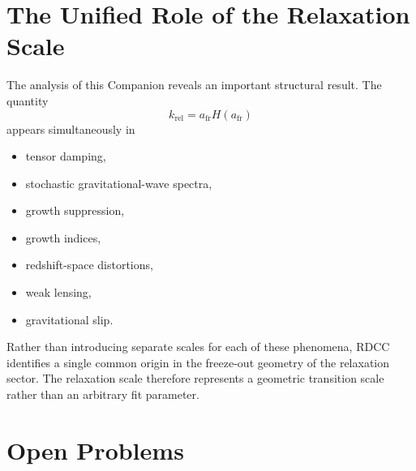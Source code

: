 \documentclass[11pt,a4paper]{article}
\begin{document}
\section{The Unified Role of the Relaxation Scale}

The analysis of this Companion reveals an important structural result. The
quantity
\begin{equation}
  k_{\mathrm{rel}}
  =
  a_{\mathrm{fr}} H(a_{\mathrm{fr}})
\end{equation}
appears simultaneously in
\begin{itemize}
  \item tensor damping,
  \item stochastic gravitational-wave spectra,
  \item growth suppression,
  \item growth indices,
  \item redshift-space distortions,
  \item weak lensing,
  \item gravitational slip.
\end{itemize}
Rather than introducing separate scales for each of these phenomena, RDCC
identifies a single common origin in the freeze-out geometry of the
relaxation sector. The relaxation scale therefore represents a geometric
transition scale rather than an arbitrary fit parameter.

\section{Open Problems}
\end{document}

